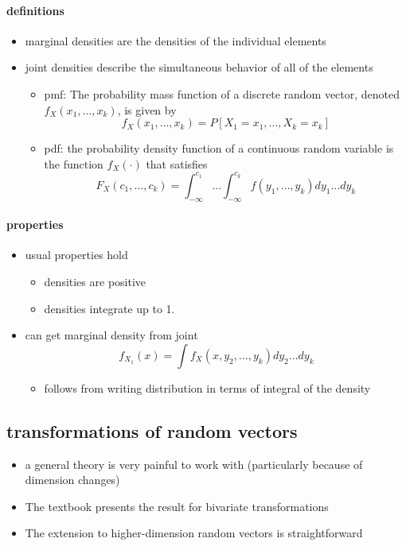 \paragraph{definitions}
\begin{itemize}
\item marginal densities are the densities of the individual elements
\item joint densities describe the simultaneous behavior of all of
        the elements
\begin{itemize}
\item pmf: The probability mass function of a discrete random vector,
          denoted $f_X(x_1,\dots, x_k)$, is given by 
          \[f_X(x_1,\dots,x_k) = P[X_1 = x_1,\dots,X_k = x_k]\]
\item pdf: the probability density function of a continuous random
          variable is the function $f_X(\cdot)$ that satisfies
          \[ F_X(c_1,\dotsc,c_k) = \int_{-\infty}^{c_1} \dots
          \int_{-\infty}^{c_k} f(y_1,\dots,y_k) dy_1 \dots dy_k \]
\end{itemize}
\end{itemize}

\paragraph{properties}
\begin{itemize}
\item usual properties hold
\begin{itemize}
\item densities are positive
\item densities integrate up to 1.
\end{itemize}
\item can get marginal density from joint
        \[ f_{X_1}(x) = \int f_X(x, y_2,\dots,y_k) dy_2 \dots dy_k \]
\begin{itemize}
\item follows from writing distribution in terms of integral of
          the density
\end{itemize}
\end{itemize}

\subsection{transformations of random vectors}

\begin{itemize}
\item a general theory is very painful to work with (particularly
        because of dimension changes)
\item The textbook presents the result for bivariate transformations
\item The extension to higher-dimension random vectors is
        straightforward
\end{itemize}

